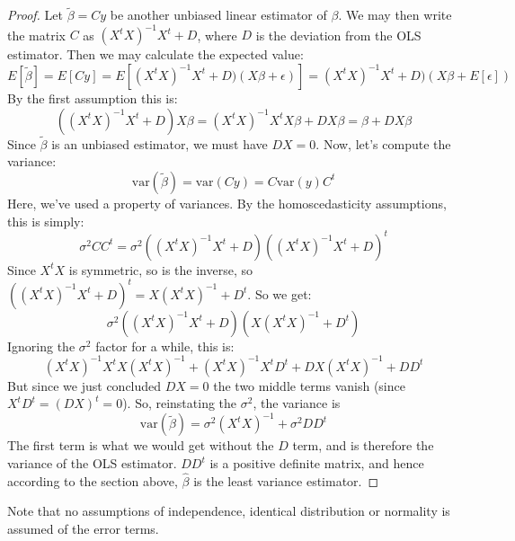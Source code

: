 \documentclass[12pt, a4paper]{article}
\begin{document}
\begin{proof}
Let $\tilde{\beta}=Cy$ be another unbiased linear estimator of $\beta$. We may  then write the matrix $C$ as $(X^t X)^{-1}X^t+D$, where $D$ is the deviation from the OLS estimator. Then we may calculate the expected value:
\begin{equation}
E[\tilde{\beta}]=E[Cy]=E[(X^t X)^{-1}X^t+D)(X\beta+\epsilon)]=(X^t X)^{-1}X^t+D)(X\beta+E[\epsilon])
\end{equation}
By the first assumption this is:
\begin{equation}
((X^t X)^{-1}X^t+D)X\beta=(X^t X)^{-1}X^t X\beta+DX\beta=\beta+DX\beta
\end{equation}
Since $\tilde{\beta}$ is an unbiased estimator, we must have $DX=0$. Now, let's compute the variance:
\begin{equation}
\textrm{var}(\tilde{\beta})=\textrm{var}(Cy)=C\textrm{var}(y)C^t
\end{equation}
Here, we've used a property of variances. By the homoscedasticity assumptions, this is simply:
\begin{equation}
\sigma^2 CC^t=\sigma^2((X^t X)^{-1}X^t+D)((X^t X)^{-1}X^t+D)^t
\end{equation}
Since $X^t X$ is symmetric, so is the inverse, so $((X^t X)^{-1}X^t+D)^t=X(X^t X)^{-1}+D^t$. So we get:
\begin{equation}
\sigma^2((X^t X)^{-1}X^t+D)(X(X^t X)^{-1}+D^t)
\end{equation}
Ignoring the $\sigma^2$ factor for a while, this is:
\begin{equation}
(X^t X)^{-1}X^tX(X^t X)^{-1}+(X^t X)^{-1}X^tD^t+DX(X^t X)^{-1}+DD^t
\end{equation}
But since we just concluded $DX=0$ the two middle terms vanish (since $X^tD^t=(DX)^t=0$). So, reinstating the $\sigma^2$, the variance is
\begin{equation}
\textrm{var}(\tilde{\beta})=\sigma^2(X^t X)^{-1}+\sigma^2 DD^t
\end{equation}
The first term is what we would get without the $D$ term, and is therefore the variance of the OLS estimator. $DD^t$ is a positive definite matrix, and hence according to the section above, $\hat{\beta}$ is the least variance estimator.
\end{proof}

Note that no assumptions of independence, identical distribution or normality is assumed of the error terms.
\end{document}
